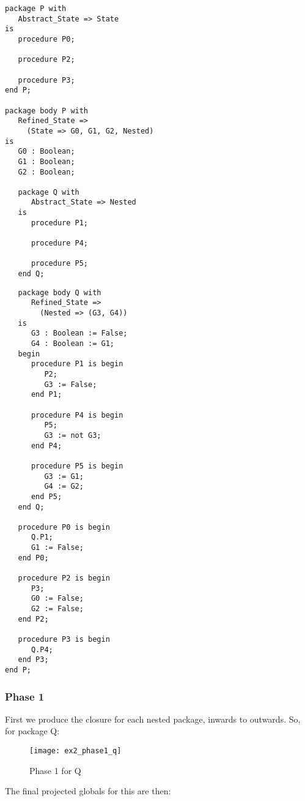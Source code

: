 \documentclass{article}
\begin{document}
\begin{multicols}{2}
\begin{lstlisting}
package P with
   Abstract_State => State
is
   procedure P0;

   procedure P2;

   procedure P3;
end P;

package body P with
   Refined_State =>
     (State => G0, G1, G2, Nested)
is
   G0 : Boolean;
   G1 : Boolean;
   G2 : Boolean;

   package Q with
      Abstract_State => Nested
   is
      procedure P1;

      procedure P4;

      procedure P5;
   end Q;
\end{lstlisting}
\vfill\columnbreak
\begin{lstlisting}
   package body Q with
      Refined_State =>
        (Nested => (G3, G4))
   is
      G3 : Boolean := False;
      G4 : Boolean := G1;
   begin
      procedure P1 is begin
         P2;
         G3 := False;
      end P1;

      procedure P4 is begin
         P5;
         G3 := not G3;
      end P4;

      procedure P5 is begin
         G3 := G1;
         G4 := G2;
      end P5;
   end Q;

   procedure P0 is begin
      Q.P1;
      G1 := False;
   end P0;

   procedure P2 is begin
      P3;
      G0 := False;
      G2 := False;
   end P2;

   procedure P3 is begin
      Q.P4;
   end P3;
end P;
\end{lstlisting}
\end{multicols}

\pagebreak
\subsubsection{Phase 1}

First we produce the closure for each nested package, inwards to outwards.
So, for package Q:

\begin{figure}[h]
  \begin{center}
    \texttt{[image: ex2\_phase1\_q]}
  \end{center}
  \caption{Phase 1 for Q}
\end{figure}

The final projected globals for this are then:
\end{document}
